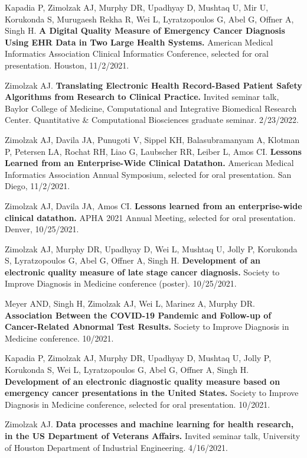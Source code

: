 \documentclass[10pt]{article}
\begin{document}
Kapadia P, Zimolzak AJ, Murphy DR, Upadhyay D, Mushtaq U, Mir U,
Korukonda S, Murugaesh Rekha R, Wei L, Lyratzopoulos G, Abel G, Offner
A, Singh H. \textbf{A Digital Quality Measure of Emergency Cancer
  Diagnosis Using EHR Data in Two Large Health Systems.} American
Medical Informatics Association Clinical Informatics Conference,
selected for oral presentation. Houston, 11/2/2021.


Zimolzak AJ. \textbf{Translating Electronic Health Record-Based
  Patient Safety Algorithms from Research to Clinical Practice.}
Invited seminar talk, Baylor College of Medicine, Computational and
Integrative Biomedical Research Center. Quantitative \& Computational
Biosciences graduate seminar. 2/23/2022.


Zimolzak AJ, Davila JA, Punugoti V, Sippel KH, Balasubramanyam A,
Klotman P, Petersen LA, Rochat RH, Liao G, Laubscher RR, Leiber L,
Amos CI. \textbf{Lessons Learned from an Enterprise-Wide Clinical
  Datathon.} American Medical Informatics Association Annual
Symposium, selected for oral presentation. San Diego, 11/2/2021.

Zimolzak AJ, Davila JA, Amos CI. \textbf{Lessons learned from an
  enterprise-wide clinical datathon.} APHA 2021 Annual Meeting,
selected for oral presentation. Denver, 10/25/2021.


Zimolzak AJ, Murphy DR, Upadhyay D, Wei L, Mushtaq U, Jolly P,
Korukonda S, Lyratzopoulos G, Abel G, Offner A, Singh H.
\textbf{Development of an electronic quality measure of late stage
  cancer diagnosis.} Society to Improve Diagnosis in Medicine
conference (poster). 10/25/2021.

Meyer AND, Singh H, Zimolzak AJ, Wei L, Marinez A, Murphy DR.
\textbf{Association Between the COVID-19 Pandemic and Follow-up of
  Cancer-Related Abnormal Test Results.} Society to Improve Diagnosis
in Medicine conference. 10/2021.

Kapadia P, Zimolzak AJ, Murphy DR, Upadhyay D, Mushtaq U, Jolly P,
Korukonda S, Wei L, Lyratzopoulos G, Abel G, Offner A, Singh H.
\textbf{Development of an electronic diagnostic quality measure based
  on emergency cancer presentations in the United States.} Society to
Improve Diagnosis in Medicine conference, selected for oral
presentation. 10/2021.

Zimolzak AJ. \textbf{Data processes and machine learning for health
  research, in the US Department of Veterans Affairs.} Invited seminar
talk, University of Houston Department of Industrial Engineering.
4/16/2021.
\end{document}
